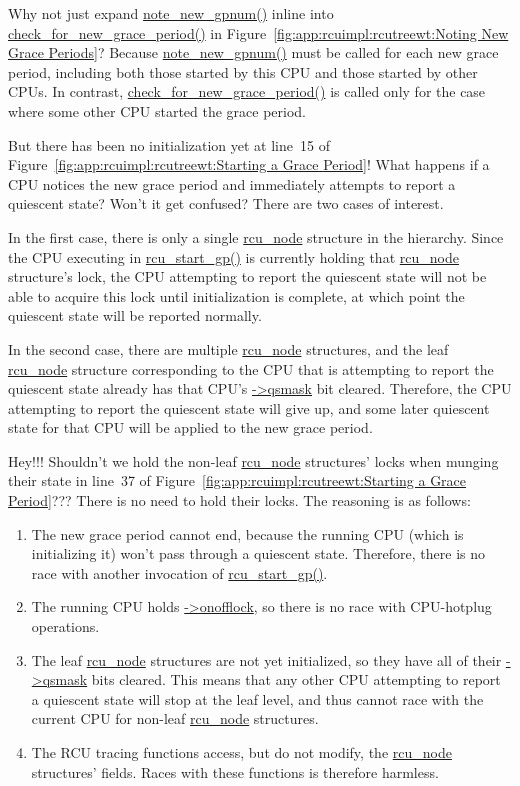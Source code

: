 \QuickQ{}
	Why not just expand \url{note_new_gpnum()} inline into
	\url{check_for_new_grace_period()} in
	Figure~\ref{fig:app:rcuimpl:rcutreewt:Noting New Grace Periods}?
\QuickA{}
	Because \url{note_new_gpnum()} must be called for each new
	grace period, including both those started by this CPU and
	those started by other CPUs.
	In contrast, \url{check_for_new_grace_period()} is called only
	for the case where some other CPU started the grace period.

\QuickQ{}
	But there has been no initialization yet at line~15 of
	Figure~\ref{fig:app:rcuimpl:rcutreewt:Starting a Grace Period}!
	What happens if a CPU notices the new grace period and
	immediately attempts to report a quiescent state?
	Won't it get confused?
\QuickA{}
	There are two cases of interest.

	In the first case, there is only a single \url{rcu_node}
	structure in the hierarchy.
	Since the CPU executing in \url{rcu_start_gp()} is currently
	holding that \url{rcu_node} structure's lock, the CPU
	attempting to report the quiescent state will not be able
	to acquire this lock until initialization is complete,
	at which point the quiescent state will be reported
	normally.

	In the second case, there are multiple \url{rcu_node} structures,
	and the leaf \url{rcu_node} structure corresponding to the
	CPU that is attempting to report the quiescent state already
	has that CPU's \url{->qsmask} bit cleared.
	Therefore, the CPU attempting to report the quiescent state
	will give up, and some later quiescent state for that CPU
	will be applied to the new grace period.

\QuickQ{}
	Hey!!!
	Shouldn't we hold the non-leaf \url{rcu_node} structures'
	locks when munging their state in line~37 of
	Figure~\ref{fig:app:rcuimpl:rcutreewt:Starting a Grace Period}???
\QuickA{}
	There is no need to hold their locks.
	The reasoning is as follows:
	\begin{enumerate}
	\item	The new grace period cannot end, because the running CPU
		(which is initializing it) won't pass through a
		quiescent state.
		Therefore, there is no race with another invocation
		of \url{rcu_start_gp()}.
	\item	The running CPU holds \url{->onofflock}, so there
		is no race with CPU-hotplug operations.
	\item	The leaf \url{rcu_node} structures are not yet initialized,
		so they have all of their \url{->qsmask} bits cleared.
		This means that any other CPU attempting to report
		a quiescent state will stop at the leaf level,
		and thus cannot race with the current CPU for non-leaf
		\url{rcu_node} structures.
	\item	The RCU tracing functions access, but do not modify,
		the \url{rcu_node} structures' fields.
		Races with these functions is therefore harmless.
	\end{enumerate}

